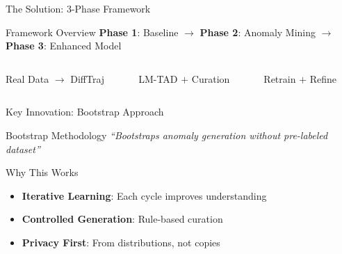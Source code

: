 \documentclass[aspectratio=169,xcolor={dvipsnames}]{beamer}
\newcommand{\phase}[1]{\textcolor{ScienceBlue}{\textbf{Phase #1}}}
\begin{document}
\begin{frame}{The Solution: 3-Phase Framework}
  \begin{block}{Framework Overview}
    \centering
    \phase{1}: Baseline $\rightarrow$ \phase{2}: Anomaly Mining $\rightarrow$ \phase{3}: Enhanced Model
  \end{block}
  \vspace{1em}
  \begin{center}
  \end{center}
  \vspace{1em}
  \begin{columns}[T,onlytextwidth]
    \begin{column}{0.33\textwidth}
      \centering\scriptsize Real Data $\rightarrow$ DiffTraj
    \end{column}
    \begin{column}{0.33\textwidth}
      \centering\scriptsize LM-TAD $+$ Curation
    \end{column}
    \begin{column}{0.33\textwidth}
      \centering\scriptsize Retrain $+$ Refine
    \end{column}
  \end{columns}
\end{frame}

\begin{frame}{Key Innovation: Bootstrap Approach}
  \begin{alertblock}{Bootstrap Methodology}
    \centering
    \large\textit{``Bootstraps anomaly generation without pre-labeled dataset''}
  \end{alertblock}
  
  \vspace{1em}
  \begin{block}{Why This Works}
    \begin{itemize}
      \item \textbf{Iterative Learning}: Each cycle improves understanding
      \item \textbf{Controlled Generation}: Rule-based curation
      \item \textbf{Privacy First}: From distributions, not copies
    \end{itemize}
  \end{block}
\end{frame}
\end{document}
